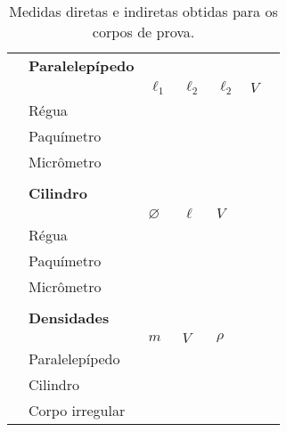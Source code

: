 \begin{table*}[!htpb]
	\label{Tab:DadosMedidasCorposSolidos}
	\begin{center}
	\begin{tabular}{clp{25mm}p{25mm}p{25mm}p{25mm}c}
	\toprule
		&\textbf{Paralelepípedo}\\
		\cmidrule{2-6}
		&& $\ell_1$ & $\ell_2$ & $\ell_2$ & $V$ & \\
		\cmidrule{2-6}	
		&\cellcolor[gray]{0.89}Régua & \cellcolor[gray]{0.92} & \cellcolor[gray]{0.89} & \cellcolor[gray]{0.92} & \cellcolor[gray]{0.89}\\
		&\cellcolor[gray]{0.95}Paquímetro & \cellcolor[gray]{0.97} & \cellcolor[gray]{0.95} & \cellcolor[gray]{0.97} & \cellcolor[gray]{0.95}\\
		&\cellcolor[gray]{0.89}Micrômetro & \cellcolor[gray]{0.92} & \cellcolor[gray]{0.89} & \cellcolor[gray]{0.92} & \cellcolor[gray]{0.89}\\
		\cmidrule{2-6}
\\
		&\textbf{Cilindro} \\
		\cmidrule{2-5}
		&& $\diameter$ & $\ell$ & $V$  \\
		\cmidrule{2-5}
		&\cellcolor[gray]{0.89}Régua & \cellcolor[gray]{0.92} & \cellcolor[gray]{0.89} & \cellcolor[gray]{0.92} \\
		&\cellcolor[gray]{0.95}Paquímetro & \cellcolor[gray]{0.97} & \cellcolor[gray]{0.95} & \cellcolor[gray]{0.97} \\
		&\cellcolor[gray]{0.89}Micrômetro & \cellcolor[gray]{0.92} & \cellcolor[gray]{0.89} & \cellcolor[gray]{0.92} \\
		\cmidrule{2-5}
\\
		&\textbf{Densidades}\\
		\cmidrule{2-5}
		&& $m$ & $V$ & $\rho$ \\
		\cmidrule{2-5}
		&\cellcolor[gray]{0.89}Paralelepípedo & \cellcolor[gray]{0.92} & \cellcolor[gray]{0.89} & \cellcolor[gray]{0.92} \\
		&\cellcolor[gray]{0.95}Cilindro & \cellcolor[gray]{0.97} & \cellcolor[gray]{0.95} & \cellcolor[gray]{0.97} \\
		&\cellcolor[gray]{0.89}Corpo irregular & \cellcolor[gray]{0.92} & \cellcolor[gray]{0.89} & \cellcolor[gray]{0.92} \\
		\cmidrule{2-5}
	\bottomrule
	\end{tabular}
	\end{center}
	\caption{Medidas diretas e indiretas obtidas para os corpos de prova.}
\end{table*}

